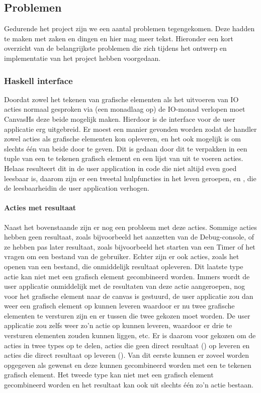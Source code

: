 \subsection{Problemen}

Gedurende het project zijn we een aantal problemen tegengekomen. Deze hadden te maken met zaken en dingen en hier mag meer tekst. Hieronder een kort overzicht van de belangrijkste problemen die zich tijdens het ontwerp en implementatie van het project hebben voorgedaan.

\subsubsection{Haskell interface}
Doordat zowel het tekenen van grafische elementen als het uitvoeren van IO acties normaal gesproken via (een monadlaag op) de IO-monad verlopen moet CanvasHs deze beide mogelijk maken. Hierdoor is de interface voor de user applicatie erg uitgebreid. 
Er moest een manier gevonden worden zodat de handler zowel acties als grafische elementen kon opleveren, en het ook mogelijk is om slechts één van beide door te geven. Dit is gedaan door dit te verpakken in een tuple van een te tekenen grafisch element en een lijst van uit te voeren acties. Helaas resulteert dit in de user application in code die niet altijd even goed leesbaar is, daarom zijn er een tweetal hulpfuncties in het leven geroepen,  en , die de leesbaarheidin de user application verhogen.

\paragraph{Acties met resultaat}
Naast het bovenstaande zijn er nog een probleem met deze acties. Sommige acties hebben geen resultaat, zoals bijvoorbeeld het aanzetten van de Debug-console, of ze hebben pas later resultaat, zoals bijvoorbeeld het starten van een Timer of het vragen om een bestand van de gebruiker. Echter zijn er ook acties, zoals het openen van een bestand, die onmiddelijk resultaat opleveren. 
Dit laatste type actie kan niet met een grafisch element gecombineerd worden.  Immers wordt de user applicatie onmiddelijk met de resultaten van deze actie aangeroepen, nog voor het grafische element naar de canvas is gestuurd, de user applicatie zou dan weer een grafisch element op kunnen leveren waardoor er nu twee grafische elementen te versturen zijn en er tussen die twee gekozen moet worden. De user applicatie zou zelfs weer zo'n actie op kunnen leveren, waardoor er drie te versturen elementen zouden kunnen liggen, etc. 
Er is daarom voor gekozen om de acties in twee types op te delen, acties die geen direct resultaat () op leveren en acties die direct resultaat op leveren (). Van dit eerste kunnen er zoveel worden opgegeven als gewenst en deze kunnen gecombineerd worden met een te tekenen grafisch element. Het tweede type kan niet met een grafisch element gecombineerd worden en het resultaat kan ook uit slechts één zo'n actie bestaan. 


